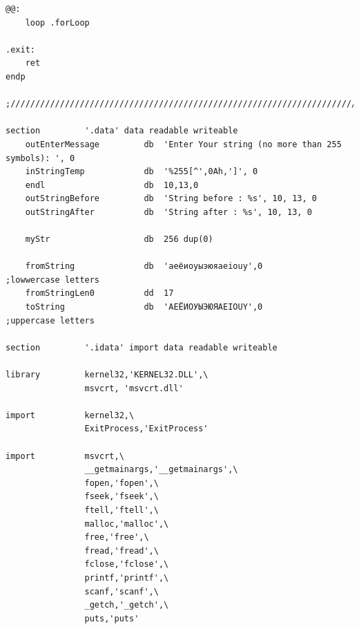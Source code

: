\documentclass[14pt,a4paper]{article}
\begin{document}
\begin{verbatim}
@@:
    loop .forLoop
    
.exit:
    ret
endp

;///////////////////////////////////////////////////////////////////////

section         '.data' data readable writeable
    outEnterMessage         db 	'Enter Your string (no more than 255 symbols): ', 0
    inStringTemp            db	'%255[^',0Ah,']', 0
    endl                    db	10,13,0
    outStringBefore         db	'String before : %s', 10, 13, 0
    outStringAfter          db	'String after : %s', 10, 13, 0

    myStr                   db	256 dup(0)

    fromString              db 	'аеёиоуыэюяaeiouy',0            ;lowwercase letters
    fromStringLen0          dd	17	
    toString                db 	'АЕЁИОУЫЭЮЯAEIOUY',0            ;uppercase letters

section         '.idata' import data readable writeable
 
library         kernel32,'KERNEL32.DLL',\
                msvcrt, 'msvcrt.dll'
 
import          kernel32,\ 
                ExitProcess,'ExitProcess'

import          msvcrt,\
                __getmainargs,'__getmainargs',\
                fopen,'fopen',\
                fseek,'fseek',\
                ftell,'ftell',\
                malloc,'malloc',\
                free,'free',\
                fread,'fread',\
                fclose,'fclose',\
                printf,'printf',\
                scanf,'scanf',\
                _getch,'_getch',\
                puts,'puts'
    \end{verbatim}
     
\end{document}
